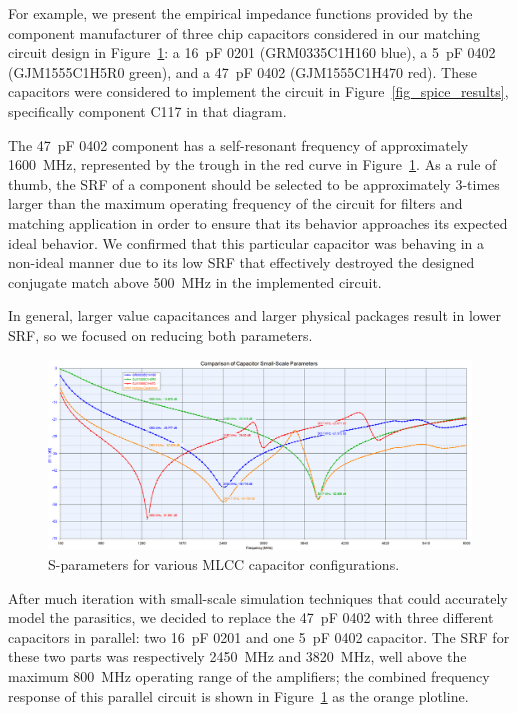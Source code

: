 	\pagebreak
	
	For example, we present the empirical impedance functions provided by the component manufacturer of three chip capacitors considered in our matching circuit design in Figure~\ref{fig_cap_comparison}: a 16~pF 0201 (GRM0335C1H160 blue), a 5~pF 0402 (GJM1555C1H5R0 green), and a 47~pF 0402 (GJM1555C1H470 red).
	These capacitors were considered to implement the circuit in Figure~\ref{fig_spice_results}, specifically component C117 in that diagram.
	
	The 47~pF 0402 component has a self-resonant frequency of approximately 1600~MHz, represented by the trough in the red curve in Figure~\ref{fig_cap_comparison}.
	As a rule of thumb, the \ac{SRF} of a component should be selected to be approximately 3-times larger than the maximum operating frequency of the circuit for filters and matching application in order to ensure that its behavior approaches its expected ideal behavior.
	We confirmed that this particular capacitor was behaving in a non-ideal manner due to its low \ac{SRF} that effectively destroyed the designed conjugate match above 500~MHz in the implemented circuit.
	
	In general, larger value capacitances and larger physical packages result in lower \ac{SRF}, so we focused on reducing both parameters.
	
\begin{figure}[hb]
\centering
  \includegraphics[width=1\linewidth]{figs/matching/capacitor_comparison}   
    \caption{S-parameters for various MLCC capacitor configurations.}
\label{fig_cap_comparison}
\end{figure}
	
	After much iteration with small-scale simulation techniques that could accurately model the parasitics, we decided to replace the 47~pF 0402 with three different capacitors in parallel: two 16~pF 0201 and one 5~pF 0402 capacitor.
	The \ac{SRF} for these two parts was respectively 2450~MHz and 3820~MHz, well above the maximum 800~MHz operating range of the amplifiers; the combined frequency response of this parallel circuit is shown in Figure~\ref{fig_cap_comparison} as the orange plotline.
		

